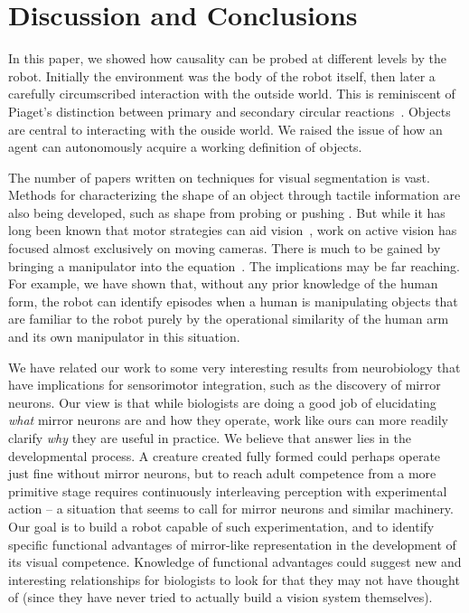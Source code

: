 
\section{Discussion and Conclusions}

In this paper, we showed how causality can be probed at different
levels by the robot.  Initially the environment was the body of the
robot itself, then later a carefully circumscribed interaction with
the outside world.  This is reminiscent of Piaget's distinction
between primary and secondary circular
reactions~\cite{ginsburg78piaget}.  Objects are central to interacting
with the ouside world.  We raised the issue of how an agent can
autonomously acquire a working definition of objects. 

The number of papers written on techniques for visual segmentation is
vast.  Methods for characterizing the shape of an object through
tactile information are also being developed, such as shape from
probing 
\cite{paulos99fast} 
or pushing
\cite{moll01reconstructing}.  
But while it has long
been known that motor strategies can aid
vision~\cite{ballard91animate}, work on active vision has focused
almost exclusively on moving cameras.  There is much to be gained by
bringing a manipulator into the equation~\cite{tsikos91segmentation}.
The implications may be far reaching.  For example,
we have shown that, without any prior knowledge of the human form, 
the robot can identify episodes when a human is manipulating objects
that are familiar to the robot purely by the operational similarity 
of the human arm and its own manipulator in this situation.

We have related our work to some very interesting results from
neurobiology that have implications for sensorimotor integration, such
as the discovery of mirror neurons.  Our view is that while biologists
are doing a good job of elucidating {\em what} mirror neurons are and
how they operate, work like ours can more readily clarify {\em why}
they are useful in practice.  We believe that answer lies in the
developmental process.  A creature created fully formed could perhaps
operate just fine without mirror neurons, but to reach adult
competence from a more primitive stage requires continuously
interleaving perception with experimental action -- a situation that
seems to call for mirror neurons and similar machinery.  Our goal is
to build a robot capable of such experimentation, and to identify
specific functional advantages of mirror-like representation in the
development of its visual competence.  Knowledge of functional
advantages could suggest new and interesting relationships for biologists to
look for that they may not have thought of (since they have never
tried to actually build a vision system themselves).



